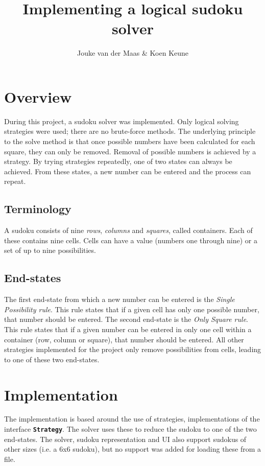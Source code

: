 \documentclass[11pt, a4paper, fleqn]{article}
\title{Implementing a logical sudoku solver}
\author{Jouke van der Maas \& Koen Keune}
\newcommand{\class}[1]{{\color{class}\textbf{\lstinline{#1}}}}
\begin{document}
\maketitle

\section{Overview}
During this project, a sudoku solver was implemented. Only
logical solving strategies were used; there are no brute-force methods.
The underlying principle to the solve method is that once
possible numbers have been calculated for each square, they can only be removed.
Removal of possible numbers is achieved by a strategy.
By trying strategies repeatedly, one of two states can always be achieved. From these
states, a new number can be entered and the process can repeat.

\subsection{Terminology}
A sudoku consists of nine \emph{rows}, \emph{columns} and \emph{squares}, called containers. Each of these
contains nine cells. Cells can have a value (numbers one through nine) or a set of up to nine possibilities.

\subsection{End-states}
The first end-state from which a new number can be entered is the 
\emph{Single Possibility rule}. This rule states that if a given cell has only one
possible number, that number should be entered. The second end-state is the \emph{%
Only Square rule}. This rule states that if a given number can be entered in only one
cell within a container (row, column or square), that number should be entered. All
other strategies implemented for the project only remove possibilities from cells, leading
to one of these two end-states.

\section{Implementation}
The implementation is based around the use of strategies, implementations of the interface
\class{Strategy}. The solver uses these to reduce the sudoku to one of the two end-states.
The solver, sudoku representation and UI also support sudokus of other sizes (i.e. a 6x6
sudoku), but no support was added for loading these from a file.
\end{document}

